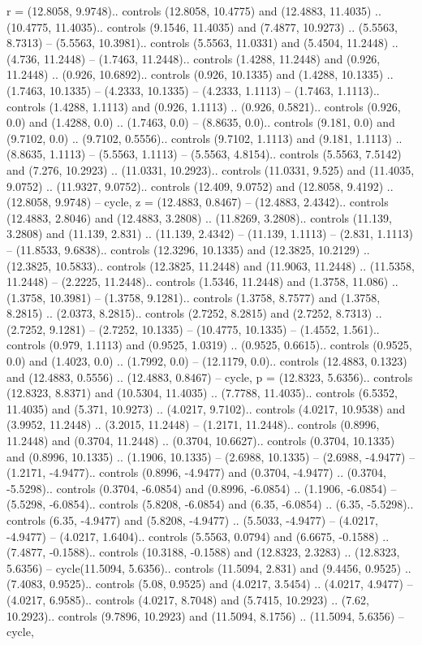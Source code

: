 r = {(12.8058, 9.9748).. controls (12.8058, 10.4775) and (12.4883, 11.4035) .. (10.4775, 11.4035).. controls (9.1546, 11.4035) and (7.4877, 10.9273) .. (5.5563, 8.7313) -- (5.5563, 10.3981).. controls (5.5563, 11.0331) and (5.4504, 11.2448) .. (4.736, 11.2448) -- (1.7463, 11.2448).. controls (1.4288, 11.2448) and (0.926, 11.2448) .. (0.926, 10.6892).. controls (0.926, 10.1335) and (1.4288, 10.1335) .. (1.7463, 10.1335) -- (4.2333, 10.1335) -- (4.2333, 1.1113) -- (1.7463, 1.1113).. controls (1.4288, 1.1113) and (0.926, 1.1113) .. (0.926, 0.5821).. controls (0.926, 0.0) and (1.4288, 0.0) .. (1.7463, 0.0) -- (8.8635, 0.0).. controls (9.181, 0.0) and (9.7102, 0.0) .. (9.7102, 0.5556).. controls (9.7102, 1.1113) and (9.181, 1.1113) .. (8.8635, 1.1113) -- (5.5563, 1.1113) -- (5.5563, 4.8154).. controls (5.5563, 7.5142) and (7.276, 10.2923) .. (11.0331, 10.2923).. controls (11.0331, 9.525) and (11.4035, 9.0752) .. (11.9327, 9.0752).. controls (12.409, 9.0752) and (12.8058, 9.4192) .. (12.8058, 9.9748) -- cycle},
z = {(12.4883, 0.8467) -- (12.4883, 2.4342).. controls (12.4883, 2.8046) and (12.4883, 3.2808) .. (11.8269, 3.2808).. controls (11.139, 3.2808) and (11.139, 2.831) .. (11.139, 2.4342) -- (11.139, 1.1113) -- (2.831, 1.1113) -- (11.8533, 9.6838).. controls (12.3296, 10.1335) and (12.3825, 10.2129) .. (12.3825, 10.5833).. controls (12.3825, 11.2448) and (11.9063, 11.2448) .. (11.5358, 11.2448) -- (2.2225, 11.2448).. controls (1.5346, 11.2448) and (1.3758, 11.086) .. (1.3758, 10.3981) -- (1.3758, 9.1281).. controls (1.3758, 8.7577) and (1.3758, 8.2815) .. (2.0373, 8.2815).. controls (2.7252, 8.2815) and (2.7252, 8.7313) .. (2.7252, 9.1281) -- (2.7252, 10.1335) -- (10.4775, 10.1335) -- (1.4552, 1.561).. controls (0.979, 1.1113) and (0.9525, 1.0319) .. (0.9525, 0.6615).. controls (0.9525, 0.0) and (1.4023, 0.0) .. (1.7992, 0.0) -- (12.1179, 0.0).. controls (12.4883, 0.1323) and (12.4883, 0.5556) .. (12.4883, 0.8467) -- cycle},
p = {(12.8323, 5.6356).. controls (12.8323, 8.8371) and (10.5304, 11.4035) .. (7.7788, 11.4035).. controls (6.5352, 11.4035) and (5.371, 10.9273) .. (4.0217, 9.7102).. controls (4.0217, 10.9538) and (3.9952, 11.2448) .. (3.2015, 11.2448) -- (1.2171, 11.2448).. controls (0.8996, 11.2448) and (0.3704, 11.2448) .. (0.3704, 10.6627).. controls (0.3704, 10.1335) and (0.8996, 10.1335) .. (1.1906, 10.1335) -- (2.6988, 10.1335) -- (2.6988, -4.9477) -- (1.2171, -4.9477).. controls (0.8996, -4.9477) and (0.3704, -4.9477) .. (0.3704, -5.5298).. controls (0.3704, -6.0854) and (0.8996, -6.0854) .. (1.1906, -6.0854) -- (5.5298, -6.0854).. controls (5.8208, -6.0854) and (6.35, -6.0854) .. (6.35, -5.5298).. controls (6.35, -4.9477) and (5.8208, -4.9477) .. (5.5033, -4.9477) -- (4.0217, -4.9477) -- (4.0217, 1.6404).. controls (5.5563, 0.0794) and (6.6675, -0.1588) .. (7.4877, -0.1588).. controls (10.3188, -0.1588) and (12.8323, 2.3283) .. (12.8323, 5.6356) -- cycle(11.5094, 5.6356).. controls (11.5094, 2.831) and (9.4456, 0.9525) .. (7.4083, 0.9525).. controls (5.08, 0.9525) and (4.0217, 3.5454) .. (4.0217, 4.9477) -- (4.0217, 6.9585).. controls (4.0217, 8.7048) and (5.7415, 10.2923) .. (7.62, 10.2923).. controls (9.7896, 10.2923) and (11.5094, 8.1756) .. (11.5094, 5.6356) -- cycle},
